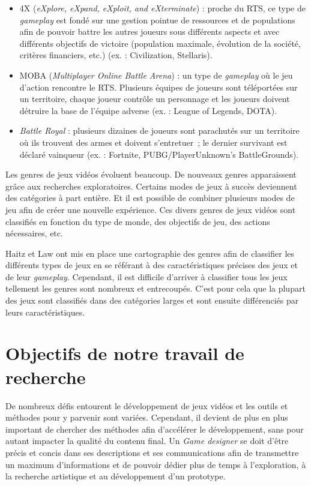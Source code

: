 \begin{itemize}
    \item 4X (\emph{eXplore, eXpand, eXploit, and eXterminate}) : proche du RTS, ce type de \emph{gameplay} est fondé sur une gestion pointue de ressources et de populations afin de pouvoir battre les autres joueurs sous différents aspects et avec différents objectifs de victoire (population maximale, évolution de la société, critères financiers, etc.) (ex. : Civilization, Stellaris).
    \item MOBA (\emph{Multiplayer Online Battle Arena}) : un type de \emph{gameplay} o\`u le jeu d'action rencontre le RTS. Plusieurs équipes de joueurs sont téléportées sur un territoire, chaque joueur contrôle un personnage et les joueurs doivent détruire la base de l'équipe adverse (ex. : League of Legends, DOTA).
    \item \emph{Battle Royal} : plusieurs dizaines de joueurs sont parachutés sur un territoire o\`u ils trouvent des armes et doivent s'entretuer~; le dernier survivant est déclaré vainqueur (ex. : Fortnite, PUBG/PlayerUnknown's BattleGrounds).
\end{itemize}

Les genres de jeux vidéos évoluent beaucoup.
De nouveaux genres apparaissent grâce aux recherches exploratoires.
Certains modes de jeux à succès deviennent des catégories à part entière.
Et il est possible de combiner plusieurs modes de jeu afin de créer une nouvelle expérience.
Ces divers genres de jeux vidéos sont classifiés en fonction du type de monde, des objectifs de jeu, des actions nécessaires, etc. 

Haitz et Law \cite{HeintzStephanie2015TGGM} ont mis en place une cartographie des genres afin de classifier les différents types de jeux en se référant à des caractéristiques précises des jeux et de leur \emph{gameplay}.
Cependant, il est difficile d'arriver à classifier tous les jeux tellement les genres sont nombreux et entrecoupés.
C'est pour cela que la plupart des jeux sont classifiés dans des catégories larges et sont ensuite différenciés par leurs caractéristiques.



\section{Objectifs de notre travail de recherche}


De nombreux défis entourent le développement de jeux vidéos et les outils et méthodes pour y parvenir sont variées.
Cependant, il devient de plus en plus important de chercher des méthodes afin d'accélérer le développement, sans pour autant impacter la qualité du contenu final.
Un \emph{Game designer} se doit d'être précis et concis dans ses descriptions et ses communications afin de transmettre un maximum d'informations et de pouvoir dédier plus de temps à l'exploration, à la recherche artistique et au développement d'un prototype. 



